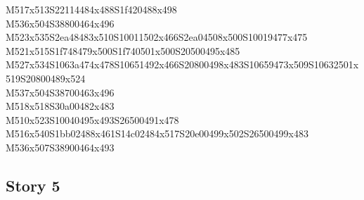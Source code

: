 \documentclass{article}
\begin{document}
\begin{multicols}{5}
\begin{center}
M517x513S22114484x488S1f420488x498 %
\\M536x504S38800464x496 %
\\M523x535S2ea48483x510S10011502x466S2ea04508x500S10019477x475 %
\\M521x515S1f748479x500S1f740501x500S20500495x485 %
\\M527x534S1063a474x478S10651492x466S20800498x483S10659473x509S10632501x519S20800489x524 %
\\M537x504S38700463x496 %
\\M518x518S30a00482x483 %
\\M510x523S10040495x493S26500491x478 %
\\M516x540S1bb02488x461S14c02484x517S20e00499x502S26500499x483 %
\\M536x507S38900464x493 %
\vfil

\end{center}
\end{multicols}

\subsection{Story 5}
\end{document}
